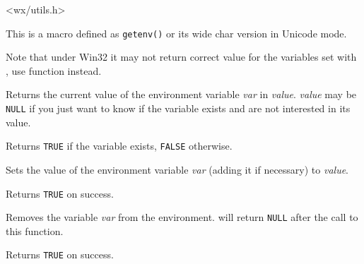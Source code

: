 <wx/utils.h>

\label{wxgetenvmacro}


This is a macro defined as {\tt getenv()} or its wide char version in Unicode
mode.

Note that under Win32 it may not return correct value for the variables set
with , use  function
instead.

\label{wxgetenv}


Returns the current value of the environment variable {\it var} in {\it value}.
{\it value} may be {\tt NULL} if you just want to know if the variable exists
and are not interested in its value.

Returns {\tt TRUE} if the variable exists, {\tt FALSE} otherwise.

\label{wxsetenv}


Sets the value of the environment variable {\it var} (adding it if necessary)
to {\it value}.

Returns {\tt TRUE} on success.

\label{wxunsetenv}


Removes the variable {\it var} from the environment.
 will return {\tt NULL} after the call to this
function.

Returns {\tt TRUE} on success.


